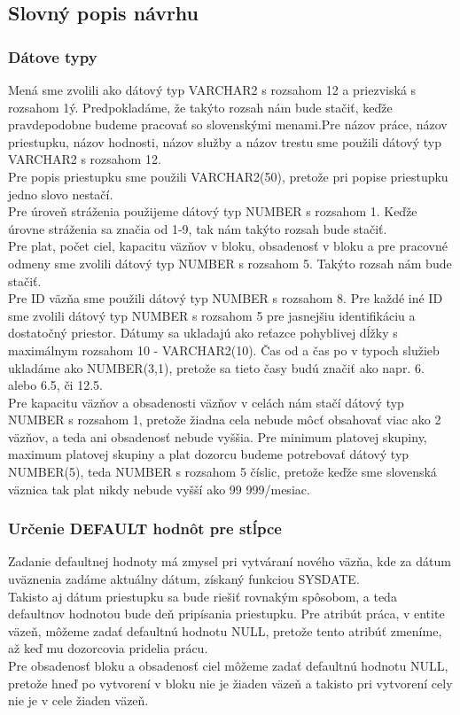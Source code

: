 \documentclass[slovak, 12pt, Times New Roman]{article}
\begin{document}
		\subsection{Slovný popis návrhu}
			\subsubsection{Dátove typy}
				Mená sme zvolili ako dátový typ VARCHAR2 s rozsahom 12 a priezviská s rozsahom 1ý. Predpokladáme, že takýto rozsah nám bude stačiť, keďže pravdepodobne budeme pracovať so slovenskými menami.Pre názov práce, názov priestupku, názov hodnosti, názov služby a názov trestu sme použili dátový typ VARCHAR2 s rozsahom 12. \\
				Pre popis priestupku sme použili VARCHAR2(50), pretože pri popise priestupku jedno slovo nestačí.\\ 
				Pre úroveň stráženia použijeme dátový typ NUMBER s rozsahom 1. Keďže úrovne stráženia sa značia od 1-9, tak nám takýto rozsah bude stačiť. \\
				Pre plat, počet ciel, kapacitu väzňov v bloku, obsadenosť v bloku a pre pracovné odmeny sme zvolili dátový typ NUMBER s rozsahom 5. Takýto rozsah nám bude stačiť.\\
				Pre ID väzňa sme použili dátový typ NUMBER s rozsahom 8.
				Pre každé iné ID sme zvolili dátový typ NUMBER s rozsahom 5 pre jasnejšiu identifikáciu a dostatočný priestor. 
				Dátumy sa ukladajú ako reťazce pohyblivej dĺžky s maximálnym rozsahom 10 - VARCHAR2(10).
				Čas od a čas po v typoch služieb ukladáme ako NUMBER(3,1), pretože sa tieto časy budú značiť ako napr. 6. alebo 6.5, či 12.5.\\
				Pre kapacitu väzňov a obsadenosti väzňov v celách nám stačí dátový typ NUMBER s rozsahom 1, pretože žiadna cela nebude môcť obsahovať viac ako 2 väzňov, a teda ani obsadenosť nebude vyššia. 
				Pre minimum platovej skupiny, maximum platovej skupiny a plat dozorcu budeme potrebovať dátový typ NUMBER(5), teda NUMBER s rozsahom 5 číslic, pretože keďže sme slovenská väznica tak plat nikdy nebude vyšší ako 99 999/mesiac.
			\subsubsection{Určenie DEFAULT hodnôt pre stĺpce}
				Zadanie defaultnej hodnoty má zmysel pri vytváraní nového väzňa, kde za dátum uväznenia zadáme aktuálny dátum, získaný funkciou SYSDATE.\\
				Takisto aj dátum priestupku sa bude riešiť rovnakým spôsobom, a teda defaultnov hodnotou bude deň pripísania priestupku.
				Pre atribút práca, v entite väzeň, môžeme zadať defaultnú hodnotu NULL, pretože tento atribúť zmeníme, až keď mu dozorcovia pridelia prácu. \\
				Pre obsadenosť bloku a obsadenosť ciel môžeme zadať defaultnú hodnotu NULL, pretože hneď po vytvorení v bloku nie je žiaden väzeň a takisto pri vytvorení cely nie je v cele žiaden väzeň. 
			\clearpage
\end{document}

